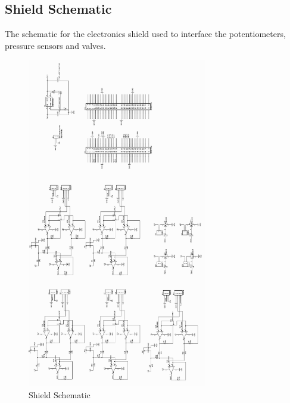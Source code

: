 \documentclass[11pt,a4paper]{article}
\begin{document}
\begin{appendices}
\clearpage
\section{Shield Schematic}
\label{sub:shieldshecmatic}
The schematic for the electronics shield used to interface the potentiometers, pressure sensors and valves. 
\begin{figure}[hbt!]
    \centering
    \includegraphics[origin=c, clip, trim=0cm 0cm 0cm 0cm, width=0.7\textwidth]{ShieldSCH_crop.pdf}
    \caption{Shield Schematic}
    \label{fig:shield_SCH}
\end{figure}
    
\clearpage

\end{appendices}
\end{document}
